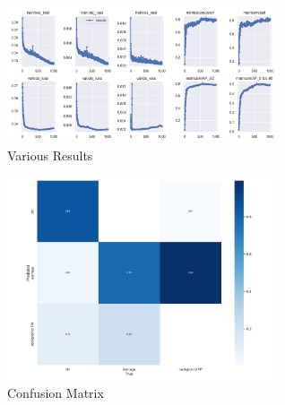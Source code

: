 \documentclass[conference]{IEEEtran}
\begin{document}
\begin{figure}[H]
    \centering
    \includegraphics[width=8cm]{Images/YOLOv5L/results.png}
    \caption{Various Results}
\end{figure}
\begin{figure}[H]
    \centering
    \includegraphics[width=8cm]{Images/Confusion Matrices/Lconfusion_matrix.png}
    \caption{Confusion Matrix}
\end{figure}
\end{document}
